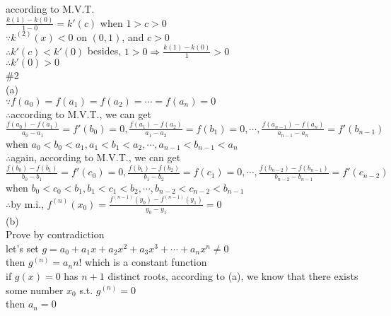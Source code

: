 \documentclass{article}
\begin{document}
according to M.V.T.\\

$\displaystyle\frac{k(1)-k(0)}{1-0}=k'(c)$ when $1>c>0$\\

$\because$\qquad$k^{(2)}(x)<0$ on $(0,1)$, and $c>0$\\

$\therefore$\qquad$k'(c)<k'(0)$ besides, $1>0\Rightarrow\displaystyle\frac{k(1)-k(0)}{1}>0$\\

$\therefore$\qquad$k'(0)>0$\\

\textcolor[rgb]{0.00,0.00,0.50}{\#2}\\

(a)\\

$\because$\qquad$f(a_0)=f(a_1)=f(a_2)=\cdots=f(a_n)=0$\\

$\therefore$\qquad according to M.V.T., we can get$\displaystyle\frac{f(a_0)-f(a_1)}{a_0-a_1}=f'(b_0)=0, \frac{f(a_1)-f(a_2)}{a_1-a_2}=f(b_1)=0,\cdots, \frac{f(a_{n-1})-f(a_n)}{a_{n-1}-a_n}=f'(b_{n-1})$ when $a_0<b_0<a_1, a_1<b_1<a_2, \cdots, a_{n-1}<b_{n-1}<a_n$\\

$\therefore$\qquad again, according to M.V.T., we can get $\displaystyle\frac{f(b_0)-f(b_1)}{b_0-b_1}=f'(c_0)=0, \frac{f(b_1)-f(b_2)}{b_1-b_2}=f(c_1)=0,\cdots, \frac{f(b_{n-2})-f(b_{n-1})}{b_{n-2}-b_{n-1}}=f'(c_{n-2})$ when $b_0<c_0<b_1, b_1<c_1<b_2, \cdots, b_{n-2}<c_{n-2}<b_{n-1}$\\

$\therefore$\qquad by m.i., $f^{(n)}(x_0)=\displaystyle\frac{f^{(n-1)}(y_0)-f^{(n-1)}(y_1)}{y_0-y_1}=0$\\

(b)\\

Prove by contradiction\\

let's set $g=a_0+a_1x+a_2x^2+a_3x^3+\cdots+a_nx^n\neq0$\\

then $g^(n)=a_nn!$ which is a constant function\\

if $g(x)=0$ has $n+1$ distinct roots, according to (a), we know that there exists some number $x_0$ s.t. $g^{(n)}=0$\\

then $a_n=0$\\
\end{document}
